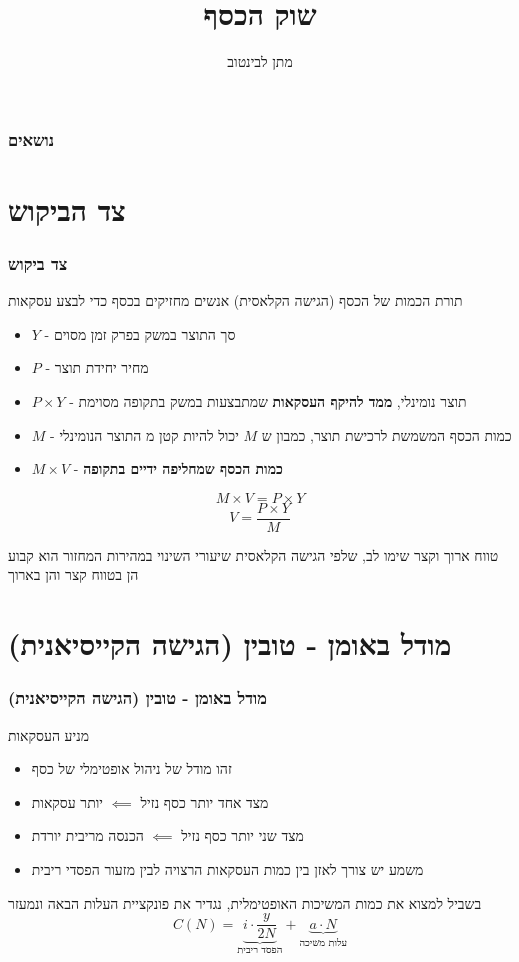 \documentclass[usenames,dvipsnames]{beamer}
\title[]{שוק הכסף}
\author{מתן לבינטוב}
\institute[{{ אב"ג}}]{{ אוניברסיטת בן גוריון בנגב}}
\begin{document}
\begin{RTL}
\begin{frame}
\titlepage
\end{frame}

\begin{frame}
    \frametitle{נושאים}
    \tableofcontents
\end{frame}

\section{צד הביקוש}
\begin{frame}[allowframebreaks]
    \frametitle{צד ביקוש}
    \begin{block}{תורת הכמות של הכסף (הגישה הקלאסית)}
        אנשים מחזיקים בכסף כדי לבצע עסקאות
    \begin{itemize}
        \item $Y$ - סך התוצר במשק בפרק זמן מסוים
        \item $P$ - מחיר יחידת תוצר
        \item $P \times Y$ - תוצר נומינלי, \textbf{ממד להיקף העסקאות} שמתבצעות במשק בתקופה מסוימת
        \item $M$ - כמות הכסף המשמשת לרכישת תוצר, כמבון ש $M$ יכול להיות קטן מ התוצר הנומינלי
        \item $M \times V$ - \textbf{כמות הכסף שמחליפה ידיים בתקופה}
    \end{itemize}

    $$M \times V = P \times Y $$
    $$V = \frac{P \times Y}{M}$$

    \end{block}

    \begin{alertblock}{טווח ארוך וקצר}
        שימו לב, שלפי הגישה הקלאסית שיעורי השינוי במהירות המחזור הוא קבוע הן בטווח קצר והן בארוך
    \end{alertblock}
    

\end{frame}

\section{מודל באומן - טובין (הגישה הקייסיאנית)}
\begin{frame}[allowframebreaks]
    \frametitle{מודל באומן - טובין (הגישה הקייסיאנית)}
    \begin{block}{מניע העסקאות}
        \begin{itemize}
            \item זהו מודל של ניהול אופטימלי של כסף
            \item מצד אחד יותר כסף נזיל $\impliedby$ יותר עסקאות
            \item מצד שני יותר כסף נזיל $\impliedby$ הכנסה מריבית יורדת
            \item משמע יש צורך לאזן בין כמות העסקאות הרצויה לבין מזעור הפסדי ריבית
        \end{itemize}
        בשביל למצוא את כמות המשיכות האופטימלית, נגדיר את פונקציית העלות הבאה ונמעזר 
        $$C(N) = \underbrace{i \cdot \frac{y}{2N}}_{\text{הפסד ריבית}} + \underbrace{a \cdot N}_{\text{עלות משיכה}}$$


\end{block}
\end{frame}
\end{RTL}
\end{document}
